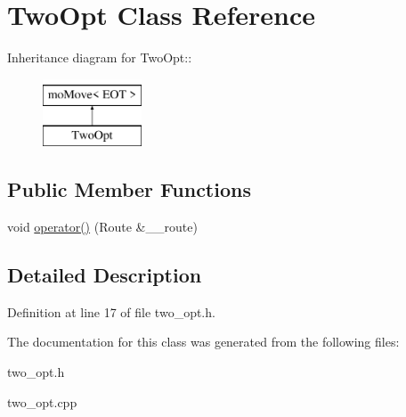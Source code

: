 \hypertarget{classTwoOpt}{
\section{Two\-Opt Class Reference}
\label{classTwoOpt}
}
Inheritance diagram for Two\-Opt::\begin{figure}[H]
\begin{center}
\leavevmode
\includegraphics[height=2cm]{classTwoOpt}
\end{center}
\end{figure}
\subsection*{Public Member Functions}
\begin{CompactItemize}
\item 
\hypertarget{classTwoOpt_ff87d1649a33d42a6d64e8d314ed1af0}{
void \hyperlink{classTwoOpt_ff87d1649a33d42a6d64e8d314ed1af0}{operator()} (Route \&\_\-\_\-route)}
\label{classTwoOpt_ff87d1649a33d42a6d64e8d314ed1af0}

\end{CompactItemize}


\subsection{Detailed Description}




Definition at line 17 of file two\_\-opt.h.

The documentation for this class was generated from the following files:\begin{CompactItemize}
\item 
two\_\-opt.h\item 
two\_\-opt.cpp\end{CompactItemize}
